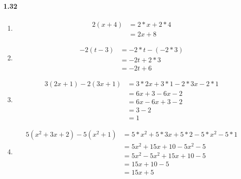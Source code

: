 \documentclass{article}
\newcommand\litem[1]{\item{\bfseries#1\space}}
\begin{document}
\paragraph{1.32}
\begin{enumerate}[label=\emph{\alph*})]
\litem{
\begin{align*}
  2(x + 4) &= 2*x + 2 * 4 \\
  &= 2x + 8
\end{align*}
}
\litem{
\begin{align*}
  -2(t - 3) &= -2 * t - (-2 * 3) \\
  &= -2t + 2 * 3 \\
  &= -2t + 6
\end{align*}
}
\litem{
\begin{align*}
  3(2x + 1 ) - 2(3x + 1) &= 3 * 2x + 3 * 1 - 2 * 3x - 2 * 1 \\
  &= 6x + 3 - 6x - 2 \\
  &= 6x - 6x + 3 - 2 \\
  &= 3 - 2 \\ 
  &= 1
\end{align*}
}
\litem{
\begin{align*}
  5(x^2 + 3x + 2) - 5(x^2 + 1) &= 5 * x^2 + 5 * 3x + 5 * 2 - 5 * x^2 - 5 * 1 \\
  &= 5x^2 + 15x + 10 - 5x^2 - 5 \\
  &= 5x^2 - 5x^2 + 15x + 10 -5 \\
  &= 15x + 10 - 5 \\
  &= 15x + 5
\end{align*}
}
\end{enumerate}
\end{document}
